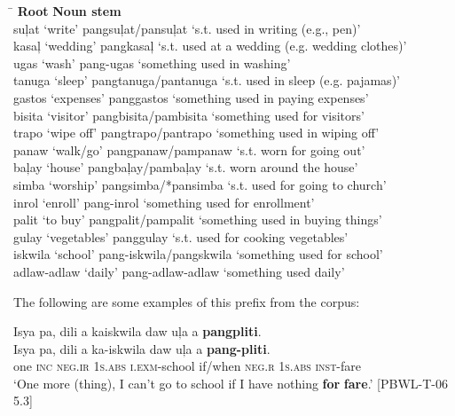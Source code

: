 \ea
\begin{tabbing}
\hspace{3.1cm} \= \kill
\textbf{Root} \> \textbf{Noun stem }\\
suļat ‘write’ \>  pangsuļat/pansuļat ‘s.t. used in writing (e.g., pen)’ \\
kasaļ ‘wedding’ \> pangkasaļ ‘s.t. used at a wedding (e.g. wedding   clothes)’ \\
ugas ‘wash’ \>  pang-ugas\footnotemark{} ‘something used in washing’ \\
tanuga ‘sleep’ \>  pangtanuga/pantanuga ‘s.t. used in sleep (e.g.   pajamas)’ \\
gastos ‘expenses’ \> panggastos ‘something used in paying expenses’ \\
bisita ‘visitor’ \> pangbisita/pambisita ‘something used for visitors’ \\
trapo ‘wipe off’ \> pangtrapo/pantrapo ‘something used in wiping off’ \\
panaw ‘walk/go’ \> pangpanaw/pampanaw ‘s.t. worn for going out’ \\
baļay ‘house’ \> pangbaļay/pambaļay ‘s.t. worn around the house’ \\
simba ‘worship’ \> pangsimba/*pansimba ‘s.t. used for going to church’ \\
inrol ‘enroll’ \> pang{}-inrol ‘something used for enrollment’ \\
palit ‘to buy' \> pangpalit/pampalit ‘something used in buying things’ \\
gulay ‘vegetables’ \> panggulay ‘s.t. used for cooking vegetables’ \\
iskwila ‘school’ \> pang-iskwila/pangskwila ‘something used for school’ \\
adlaw{}-adlaw ‘daily’ \> pang{}-adlaw{}-adlaw ‘something used daily’
\end{tabbing}
\z

The following are some examples of this prefix from the corpus:

\ea
Isya  pa,  dili  a  kaiskwila  daw  uļa  a  \textbf{pangpliti}. \\\smallskip
 \gll Isya  pa,  dili  a  ka-iskwila  daw  uļa  a  \textbf{pang-pliti}. \\
one  \textsc{inc}  \textsc{neg.ir}  1\textsc{s.abs}  \textsc{i.exm}-school  if/when  \textsc{neg.r}  1\textsc{s.abs}  \textsc{inst}-fare \\
\glt \textsc{‘}One more (thing), I can’t go to school if I have nothing \textbf{for} \textbf{fare}.’ [PBWL-T-06 5.3]
\z

